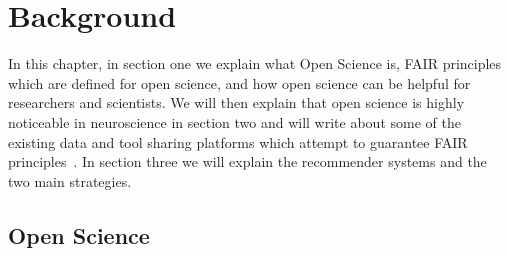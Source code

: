 \chapter{Background}
\label{background}

\cite{abrams2021standards}



In this chapter, in section one we explain what Open Science is, FAIR principles~\cite{FAIR_Principles} which are defined for open science, and how open science can be helpful for researchers and scientists. We will then explain that open science is highly noticeable in neuroscience in section two and will write about some of the existing data and tool sharing platforms which attempt to guarantee FAIR principles~\cite{wilkinson2016fair}. In section three we will explain the recommender systems and the two main strategies.





\section{Open Science}

